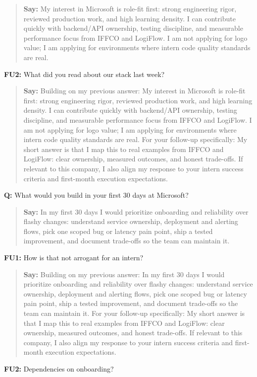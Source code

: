 \documentclass[9pt,a4paper]{article}
\begin{document}
\begin{quote}\small\textbf{Say:} My interest in Microsoft is role-fit first: strong engineering rigor, reviewed production work, and high learning density. I can contribute quickly with backend/API ownership, testing discipline, and measurable performance focus from IFFCO and LogiFlow. I am not applying for logo value; I am applying for environments where intern code quality standards are real.\end{quote}
\vspace{2mm}
\textbf{FU2:} What did you read about our stack last week?

\begin{quote}\small\textbf{Say:} Building on my previous answer: My interest in Microsoft is role-fit first: strong engineering rigor, reviewed production work, and high learning density. I can contribute quickly with backend/API ownership, testing discipline, and measurable performance focus from IFFCO and LogiFlow. I am not applying for logo value; I am applying for environments where intern code quality standards are real. For your follow-up specifically: My short answer is that I map this to real examples from IFFCO and LogiFlow: clear ownership, measured outcomes, and honest trade-offs. If relevant to this company, I also align my response to your intern success criteria and first-month execution expectations.\end{quote}
\vspace{2mm}
\textbf{Q:} What would you build in your first 30 days at Microsoft?

\begin{quote}\small\textbf{Say:} In my first 30 days I would prioritize onboarding and reliability over flashy changes: understand service ownership, deployment and alerting flows, pick one scoped bug or latency pain point, ship a tested improvement, and document trade-offs so the team can maintain it.\end{quote}
\vspace{2mm}
\textbf{FU1:} How is that not arrogant for an intern?

\begin{quote}\small\textbf{Say:} Building on my previous answer: In my first 30 days I would prioritize onboarding and reliability over flashy changes: understand service ownership, deployment and alerting flows, pick one scoped bug or latency pain point, ship a tested improvement, and document trade-offs so the team can maintain it. For your follow-up specifically: My short answer is that I map this to real examples from IFFCO and LogiFlow: clear ownership, measured outcomes, and honest trade-offs. If relevant to this company, I also align my response to your intern success criteria and first-month execution expectations.\end{quote}
\vspace{2mm}
\textbf{FU2:} Dependencies on onboarding?
\end{document}
